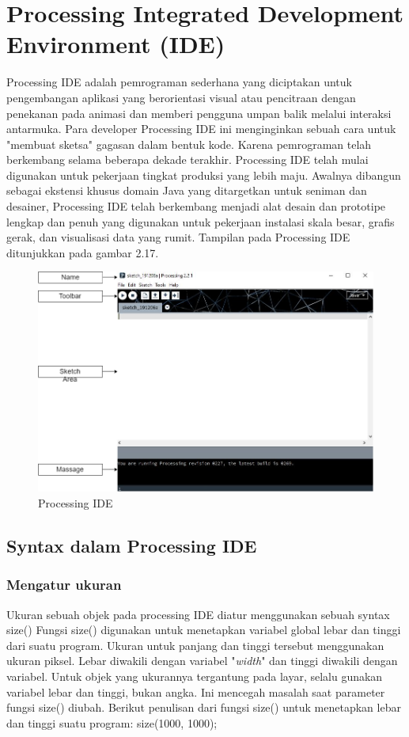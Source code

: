 \section{Processing Integrated Development Environment (IDE)}
Processing IDE adalah pemrograman sederhana yang diciptakan untuk pengembangan aplikasi yang berorientasi visual atau pencitraan dengan penekanan pada animasi dan memberi pengguna umpan balik melalui interaksi antarmuka. Para developer Processing IDE ini menginginkan sebuah cara untuk "membuat sketsa" gagasan dalam bentuk kode. Karena pemrograman telah berkembang selama beberapa dekade terakhir. Processing IDE telah mulai digunakan untuk pekerjaan tingkat produksi yang lebih maju. Awalnya dibangun sebagai ekstensi khusus domain Java yang ditargetkan untuk seniman dan desainer, Processing IDE telah berkembang menjadi alat desain dan prototipe lengkap dan penuh yang digunakan untuk pekerjaan instalasi skala besar, grafis gerak, dan visualisasi data yang rumit. Tampilan pada Processing IDE ditunjukkan pada gambar 2.17.
	\begin{figure}[H]
	\centering
	\includegraphics[width=12cm]{gambar/processing_view.png}
	\caption{Processing IDE}
\end{figure}


\subsection{Syntax dalam Processing IDE }

\subsubsection{Mengatur ukuran}
Ukuran sebuah objek pada processing IDE diatur menggunakan sebuah syntax size() Fungsi size() digunakan untuk menetapkan variabel global lebar dan tinggi dari suatu program. Ukuran untuk panjang dan tinggi tersebut menggunakan ukuran piksel. Lebar diwakili dengan variabel "\textit{width}" dan tinggi diwakili dengan variabel. Untuk objek yang ukurannya tergantung pada layar, selalu gunakan variabel lebar dan tinggi, bukan angka. Ini mencegah masalah saat parameter fungsi size() diubah. Berikut penulisan dari fungsi size() untuk menetapkan lebar dan tinggi suatu program:  size(1000, 1000); 

